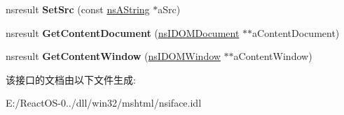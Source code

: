 \begin{DoxyCompactItemize}
\item 
\mbox{\label{interfacens_i_d_o_m_h_t_m_l_frame_element_a13c24e8f764ecf57aae7a3430a73a1be}} 
nsresult {\bfseries Set\+Src} (const \hyperlink{structns_string_container}{ns\+A\+String} $\ast$a\+Src)
\item 
\mbox{\label{interfacens_i_d_o_m_h_t_m_l_frame_element_a115e7623ca0e469c3c5dfbddf3ceed24}} 
nsresult {\bfseries Get\+Content\+Document} (\hyperlink{interfacens_i_d_o_m_document}{ns\+I\+D\+O\+M\+Document} $\ast$$\ast$a\+Content\+Document)
\item 
\mbox{\label{interfacens_i_d_o_m_h_t_m_l_frame_element_af8b37718ee97f16340ba10a07131d336}} 
nsresult {\bfseries Get\+Content\+Window} (\hyperlink{interfacens_i_d_o_m_window}{ns\+I\+D\+O\+M\+Window} $\ast$$\ast$a\+Content\+Window)
\end{DoxyCompactItemize}


该接口的文档由以下文件生成\+:\begin{DoxyCompactItemize}
\item 
E\+:/\+React\+O\+S-\/0../dll/win32/mshtml/nsiface.\+idl\end{DoxyCompactItemize}
